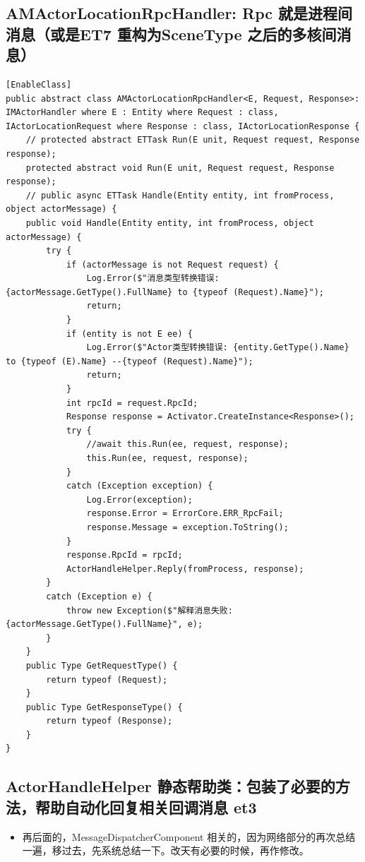 \documentclass[9pt, b5paper]{article}
\begin{document}
\subsection{AMActorLocationRpcHandler: Rpc 就是进程间消息（或是ET7 重构为SceneType 之后的多核间消息）}
\label{sec-11-9}
\begin{verbatim}
[EnableClass]
public abstract class AMActorLocationRpcHandler<E, Request, Response>: IMActorHandler where E : Entity where Request : class, IActorLocationRequest where Response : class, IActorLocationResponse {
    // protected abstract ETTask Run(E unit, Request request, Response response);
    protected abstract void Run(E unit, Request request, Response response);
    // public async ETTask Handle(Entity entity, int fromProcess, object actorMessage) {
    public void Handle(Entity entity, int fromProcess, object actorMessage) {
        try {
            if (actorMessage is not Request request) {
                Log.Error($"消息类型转换错误: {actorMessage.GetType().FullName} to {typeof (Request).Name}");
                return;
            }
            if (entity is not E ee) {
                Log.Error($"Actor类型转换错误: {entity.GetType().Name} to {typeof (E).Name} --{typeof (Request).Name}");
                return;
            }
            int rpcId = request.RpcId;
            Response response = Activator.CreateInstance<Response>();
            try {
                //await this.Run(ee, request, response);
                this.Run(ee, request, response);
            }
            catch (Exception exception) {
                Log.Error(exception);
                response.Error = ErrorCore.ERR_RpcFail;
                response.Message = exception.ToString();
            }
            response.RpcId = rpcId;
            ActorHandleHelper.Reply(fromProcess, response);
        }
        catch (Exception e) {
            throw new Exception($"解释消息失败: {actorMessage.GetType().FullName}", e);
        }
    }
    public Type GetRequestType() {
        return typeof (Request);
    }
    public Type GetResponseType() {
        return typeof (Response);
    }
}
\end{verbatim}
\subsection{ActorHandleHelper 静态帮助类：包装了必要的方法，帮助自动化回复相关回调消息 et3}
\label{sec-11-10}
\begin{itemize}
\item 再后面的，MessageDispatcherComponent 相关的，因为网络部分的再次总结一遍，移过去，先系统总结一下。改天有必要的时候，再作修改。
\end{itemize}
\end{document}
